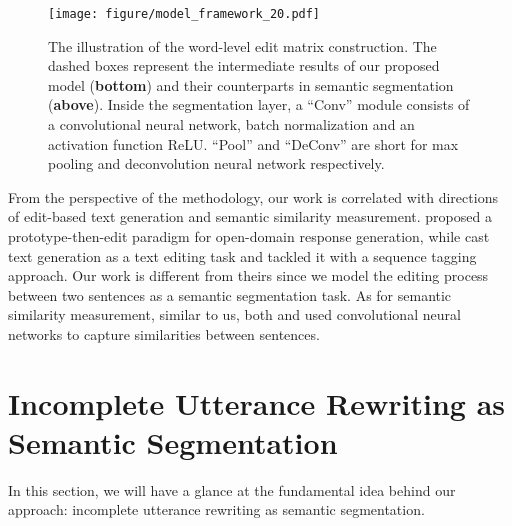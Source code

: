 \documentclass[11pt,a4paper]{article}
\begin{document}
\begin{figure*}[t]
    \centering
    \texttt{[image: figure/model\_framework\_20.pdf]}
    \caption{The illustration of the word-level edit matrix construction. The dashed boxes represent the intermediate results of our proposed model (\textbf{bottom}) and their counterparts in semantic segmentation (\textbf{above}). Inside the segmentation layer, a ``Conv'' module consists of a convolutional neural network, batch normalization and an activation function ReLU. ``Pool'' and ``DeConv'' are short for max pooling and deconvolution neural network respectively. }
    \label{fig:model_framework}
\end{figure*}


From the perspective of the methodology, our work is correlated with directions of edit-based text generation and semantic similarity measurement. \citet{wu2019response} proposed a prototype-then-edit paradigm for open-domain response generation, while \citet{malmi-etal-2019-encode} cast text generation as a text editing task and tackled it with a sequence tagging approach. Our work is different from theirs since we model the editing process between two sentences as a semantic segmentation task. As for semantic similarity measurement, similar to us, both \citet{he-lin-2016-pairwise} and \citet{pang2016text} used convolutional neural networks to capture similarities between sentences.  


\section{Incomplete Utterance Rewriting as Semantic Segmentation}\label{sec:method}

In this section, we will have a glance at the fundamental idea behind our approach: incomplete utterance rewriting as semantic segmentation.
\end{document}
